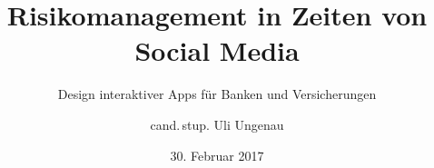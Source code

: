 \titlehead{\Large Universität Schlauenheim}
\subject{Masterarbeit}
\title{Risikomanagement in Zeiten von Social Media}
\subtitle{Design interaktiver Apps für Banken und
Versicherungen}
\author{cand.\,stup. Uli Ungenau}
\date{30. Februar 2017}
\publishers{Betreut durch Prof.\,Dr.\,rer.\,stup. Naseweis}
\dedication{Für meine Mama.}
\maketitle
